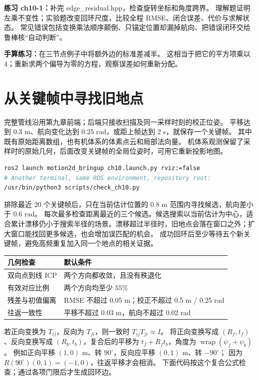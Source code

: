 \textbf{练习 ch10-1：}补完 edge\_residual.hpp，检查旋转坐标和角度跨界。
理解题证明左乘不变性；实验题改变回环尺度，比较全程 RMSE、闭合误差、代价与求解状态。
常见错误包括变换乘法顺序颠倒、只锚定位置却漏掉航向、把错误闭环交给鲁棒核“自动判断”。

\textbf{手算练习：}在三节点例子中将额外边的标准差减半。
这相当于把它的平方项乘以 4；重新求两个偏导为零的方程，观察误差如何重新分配。

\clearpage
\section{从关键帧中寻找旧地点}
完整管线沿用第九章前端；后端只接收扫描及同一采样时刻的校正位姿。
平移达到 0.3 m、航向变化达到 0.25 rad，或距上帧达到 2 s，就保存一个关键帧。
其中既有原始距离数组，也有机体系的体素点云和局部法向量。
机体系观测保留了采样时的原始几何，后面改变关键帧的全局位姿时，可用它重新投影地图。

\begin{lstlisting}[language=bash]
ros2 launch motion2d_bringup ch10.launch.py rviz:=false
# Another terminal, same ROS environment, repository root:
/usr/bin/python3 scripts/check_ch10.py
\end{lstlisting}
排除最近 20 个关键帧后，只在当前估计位置的 0.8 m 范围内寻找候选，航向差小于 0.6 rad。
每次最多检查距离最近的三个候选。候选搜索以当前估计为中心，适合累计漂移仍小于搜索半径的场景。漂移超过半径时，旧地点会落在窗口之外；扩大窗口能找回更多候选，也会增加误匹配的机会。
成功回环后至少等待五个新关键帧，避免高频重复加入同一个地点的相关证据。

\begin{center}\small
\begin{tabular}{ll}\toprule
几何检查 & 默认条件 \\\midrule
双向点到线 ICP & 两个方向都收敛，且没有秩退化 \\
有效对应比例 & 两个方向均至少 $55\%$ \\
残差与初值偏离 & RMSE 不超过 0.05 m；校正不超过 0.5 m / 0.25 rad \\
往返一致性 & 平移不超过 0.03 m，航向不超过 0.02 rad \\\bottomrule
\end{tabular}
\end{center}
若正向变换为 $T_{ij}$，反向为 $T_{ji}$，则一致时 $T_{ij}T_{ji}\approx I$。
将正向变换写成 $(R_f,t_f)$、反向变换写成 $(R_b,t_b)$，复合后的平移为
$t_f+R_ft_b$，角度为 $\operatorname{wrap}(\psi_f+\psi_b)$。
例如正向平移 $(1,0)$ m、转 $90^\circ$，反向应平移 $(0,1)$ m、转 $-90^\circ$；
因为 $R(90^\circ)(0,1)=(-1,0)$，往返平移才会相消。
下面代码按这个复合公式检查；通过各项门限后才生成回环边。


